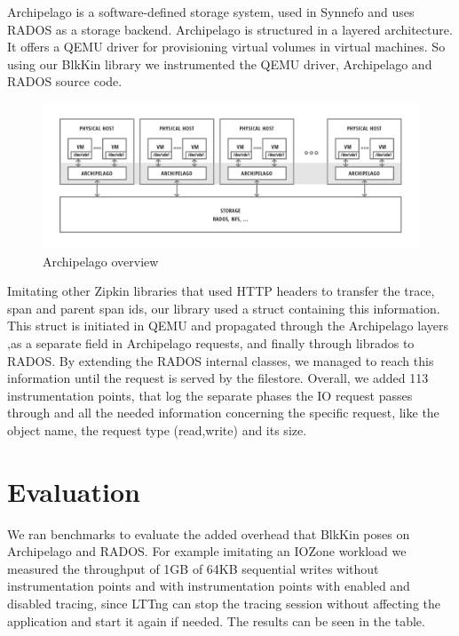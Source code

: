 \documentclass[11pt,journal,compsoc]{IEEEtran}
\begin{document}
Archipelago is a software-defined storage system, used in Synnefo\cite{synnefo}
and uses RADOS as a storage backend. Archipelago is structured in a layered
architecture. It offers a QEMU driver for provisioning virtual volumes in
virtual machines. So using our BlkKin library we instrumented the QEMU driver,
Archipelago and RADOS source code.

\begin{figure}[h!]
  \centering
  \includegraphics[scale=0.3]{figs/archipelago-overview.png}
  \caption{Archipelago overview}
  \label{fig:archipelago}
\end{figure}

Imitating other Zipkin libraries that used HTTP headers to transfer the trace,
span and parent span ids, our library used a struct containing this
information. This struct is initiated in QEMU and propagated through the
Archipelago layers ,as a separate field in Archipelago requests, and finally
through librados to RADOS. By extending the RADOS internal classes, we managed
to reach this information until the request is served by the filestore.
Overall, we added 113 instrumentation points, that log the separate phases the
IO request passes through and all the needed information concerning the
specific request, like the object name, the request type (read,write) and its
size.

\section{Evaluation}

We ran benchmarks to evaluate the added overhead that BlkKin poses on
Archipelago and RADOS. For example imitating an IOZone workload we measured the
throughput of 1GB of 64KB sequential writes without instrumentation points and
with instrumentation points with enabled and disabled tracing, since LTTng can
stop the tracing session without affecting the application and start it again if
needed. The results can be seen in the table.
\end{document}

